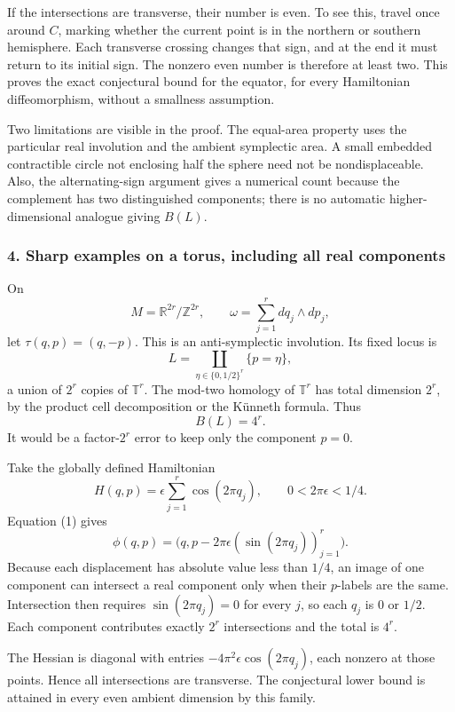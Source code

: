 \documentclass[11pt]{article}
\begin{document}
If the intersections are transverse, their number is even. To see this, travel once around $C$, marking whether the current point is in the northern or southern hemisphere. Each transverse crossing changes that sign, and at the end it must return to its initial sign. The nonzero even number is therefore at least two. This proves the exact conjectural bound for the equator, for every Hamiltonian diffeomorphism, without a smallness assumption.

Two limitations are visible in the proof. The equal-area property uses the particular real involution and the ambient symplectic area. A small embedded contractible circle not enclosing half the sphere need not be nondisplaceable. Also, the alternating-sign argument gives a numerical count because the complement has two distinguished components; there is no automatic higher-dimensional analogue giving $B(L)$.

\subsubsection{4. Sharp examples on a torus, including all real components}
On
\[
 M=\mathbb R^{2r}/\mathbb Z^{2r},\qquad
 \omega=\sum_{j=1}^r dq_j\wedge dp_j,
\]
let $\tau(q,p)=(q,-p)$. This is an anti-symplectic involution. Its fixed locus is
\[
 L=\coprod_{\eta\in\{0,1/2\}^r}\{p=\eta\},
\]
a union of $2^r$ copies of $\mathbb T^r$. The mod-two homology of $\mathbb T^r$ has total dimension $2^r$, by the product cell decomposition or the K\"unneth formula. Thus
\[
 B(L)=4^r.                                             \tag{4}
\]
It would be a factor-$2^r$ error to keep only the component $p=0$.

Take the globally defined Hamiltonian
\[
 H(q,p)=\epsilon\sum_{j=1}^r\cos(2\pi q_j),\qquad
 0<2\pi\epsilon<1/4.
\]
Equation (1) gives
\[
 \phi(q,p)=\bigl(q,p-2\pi\epsilon(\sin(2\pi q_j))_{j=1}^r\bigr).
                                                               \tag{5}
\]
Because each displacement has absolute value less than $1/4$, an image of one component can intersect a real component only when their $p$-labels are the same. Intersection then requires $\sin(2\pi q_j)=0$ for every $j$, so each $q_j$ is $0$ or $1/2$. Each component contributes exactly $2^r$ intersections and the total is $4^r$.

The Hessian is diagonal with entries
$-4\pi^2\epsilon\cos(2\pi q_j)$, each nonzero at those points. Hence all intersections are transverse. The conjectural lower bound is attained in every even ambient dimension by this family.
\end{document}
